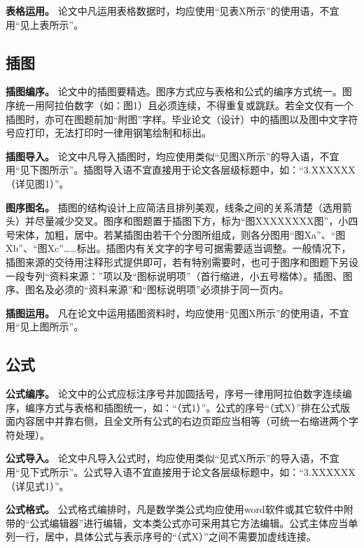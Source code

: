 \documentclass[singlesided]{Style/ucasthesis}%
\begin{document}
\textbf{表格运用。} 论文中凡运用表格数据时，均应使用``见表X所示''的使用语，不宜用``见上表所示''。

\hypertarget{section-27}{%
\subsection{插图}\label{section-27}}

\textbf{插图编序。} 论文中的插图要精选。图序方式应与表格和公式的编序方式统一。图序统一用阿拉伯数字（如：图1）且必须连续，不得重复或跳跃。若全文仅有一个插图时，亦可在图题前加``附图''字样。毕业论文（设计）中的插图以及图中文字符号应打印，无法打印时一律用钢笔绘制和标出。

\textbf{插图导入。} 论文中凡导入插图时，均应使用类似``见图X所示''的导入语，不宜用``见下图所示''。插图导入语不宜直接用于论文各层级标题中，如：``3.XXXXXX（详见图1）''。

\textbf{图序图名。} 插图的结构设计上应简洁且排列美观，线条之间的关系清楚（选用箭头）并尽量减少交叉。图序和图题置于插图下方，标为``图XXXXXXXX图''，小四号宋体，加粗，居中。若某插图由若干个分图所组成，则各分图用``图Xa''、``图Xb''、``图Xc''\ldots{}\ldots{}标出。插图内有关文字的字号可据需要适当调整。一般情况下，插图来源的交待用注释形式提供即可，若有特别需要时，也可于图序和图题下另设一段专列``资料来源：''项以及``图标说明项''（首行缩进，小五号楷体）。插图、图序、图名及必须的``资料来源''和``图标说明项''必须排于同一页内。

\textbf{插图运用。} 凡在论文中运用插图资料时，均应使用``见图X所示''的使用语，不宜用``见上图所示''。

\hypertarget{section-28}{%
\subsection{公式}\label{section-28}}

\textbf{公式编序。} 论文中的公式应标注序号并加圆括号，序号一律用阿拉伯数字连续编序，编序方式与表格和插图统一，如：``（式1）''。公式的序号``（式X）''排在公式版面内容居中并靠右侧，且全文所有公式的右边页距应当相等（可统一右缩进两个字符处理）。

\textbf{公式导入。} 论文中凡导入公式时，均应使用类似``见式X所示''的导入语，不宜用``见下式所示''。公式导入语不宜直接用于论文各层级标题中，如：``3.XXXXXX（详见式1）''。

\textbf{公式格式。} 公式格式编排时，凡是数学类公式均应使用word软件或其它软件中附带的``公式编辑器''进行编辑，文本类公式亦可采用其它方法编辑。公式主体应当单列一行，居中，具体公式与表示序号的``（式X）''之间不需要加虚线连接。
\end{document}
